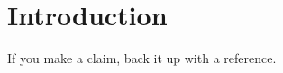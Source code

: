 \chapter{Introduction}
\blindtext

If you make a claim, back it up with a reference\cite{Ebejer2012}.